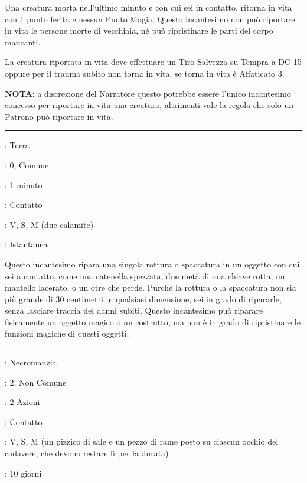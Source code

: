 \begin{multicols}{2}
Una creatura morta nell'ultimo minuto e con cui sei in contatto, ritorna in vita con 1 punto ferita e nessun Punto Magia. Questo incantesimo non può riportare in vita le persone morte di vecchiaia, né può ripristinare le parti del corpo mancanti.

La creatura riportata in vita deve effettuare un Tiro Salvezza su Tempra a DC 15 oppure per il trauma subito non torna in vita, se torna in vita è Affaticato 3.

\textbf{NOTA}: a discrezione del Narratore questo potrebbe essere l'unico incantesimo concesso per riportare in vita una creatura, altrimenti vale la regola che solo un Patrono può riportare in vita.

\smallskip\noindent\rule{\linewidth}{2pt} \hypertarget{Riparare}{}\smallskip{}
\noindent
\begin{description}[noitemsep, topsep=0pt, parsep=0pt, partopsep=0pt, leftmargin=0cm, labelwidth=2.8cm]
	\item[\textbf{Lista di Magia}]: Terra
	\item[\textbf{Livello}]: 0, Comune
	\item[\textbf{T. di Lancio}]: 1 minuto
	\item[\textbf{Gittata}]: Contatto
	\item[\textbf{Componenti}]: V, S, M (due calamite)
	\item[\textbf{Durata}]: Istantanea
\end{description}

Questo incantesimo ripara una singola rottura o spaccatura in un oggetto con cui sei a contatto, come una catenella spezzata, due metà di una chiave rotta, un mantello lacerato, o un otre che perde. Purché la rottura o la spaccatura non sia più grande di 30 centimetri in qualsiasi dimensione, sei in grado di ripararle, senza lasciare traccia dei danni subiti. Questo incantesimo può riparare fisicamente un oggetto magico o un costrutto, ma non è in grado di ripristinare le funzioni magiche di questi oggetti.

\smallskip\noindent\rule{\linewidth}{2pt} \hypertarget{Riposo Inviolato}{}\smallskip{}
\noindent
\begin{description}[noitemsep, topsep=0pt, parsep=0pt, partopsep=0pt, leftmargin=0cm, labelwidth=2.8cm]
	\item[\textbf{Lista di Magia}]: Necromanzia
	\item[\textbf{Livello}]: 2, Non Comune
	\item[\textbf{T. di Lancio}]: 2 Azioni
	\item[\textbf{Gittata}]: Contatto
	\item[\textbf{Componenti}]: V, S, M (un pizzico di sale e un pezzo di rame posto su ciascun occhio del cadavere, che devono restare lì per la durata)
	\item[\textbf{Durata}]: 10 giorni
\end{description}


\end{multicols}

